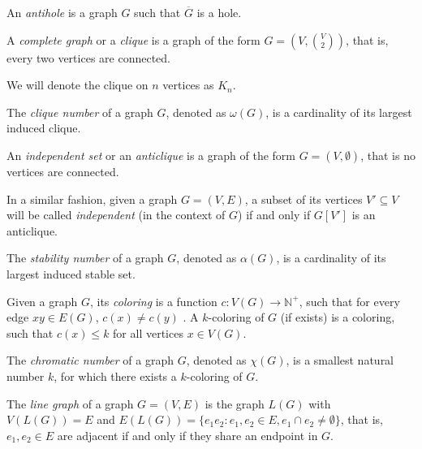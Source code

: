 \begin{defn}[antihole]
  An \emph{antihole} is a graph $G$ such that $\overline{G}$ is a hole.
\end{defn}

\begin{defn}[clique]
  A \emph{complete graph} or a \emph{clique} is a graph of the form $G = (V, {V \choose 2})$, that is, every two vertices are connected.
\end{defn}

We will denote the clique on $n$ vertices as $K_n$.

\begin{defn}
  The \emph{clique number} of a graph $G$, denoted as $\omega(G)$, is a cardinality of its largest induced clique.
\end{defn}

\begin{defn}[anticlique]
  An \emph{independent set} or an \emph{anticlique} is a graph of the form $G = (V, \emptyset)$, that is no vertices are connected.
\end{defn}
In a similar fashion, given a graph $G = (V, E)$, a subset of its vertices $V' \subseteq V$ will be called \emph{independent} (in the context of $G$) if and only if $G[V']$ is an anticlique.

\begin{defn}
  The \emph{stability number} of a graph $G$, denoted as $\alpha(G)$, is a cardinality of its largest induced stable set.
\end{defn}

\begin{defn}[coloring]
  Given a graph $G$, its \emph{coloring} is a function $c: V(G) \rightarrow \mathbb{N}^+$, such that for every edge $xy \in E(G)$, $c(x) \neq c(y)$ . A $k$-coloring of $G$ (if exists) is a coloring, such that $c(x) \leq k$ for all vertices $x \in V(G)$.
\end{defn}

\begin{defn}
  The \emph{chromatic number} of a graph $G$, denoted as $\chi(G)$, is a smallest natural number $k$, for which there exists a $k$-coloring of $G$.
\end{defn}

\begin{defn}
  The \emph{line graph} of a graph $G = (V, E)$ is the graph $L(G)$ with $V(L(G)) = E$ and $E(L(G)) = \{e_1 e_2: e_1, e_2 \in E, e_1 \cap e_2 \neq \emptyset\}$, that is, $e_1, e_2 \in E$ are adjacent if and only if they share an endpoint in $G$.
\end{defn}


